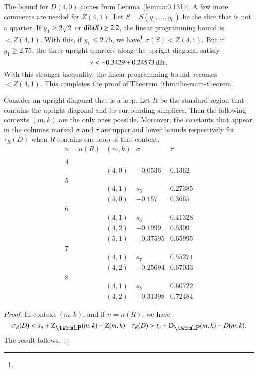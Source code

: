 The bound for $D(4,0)$ comes from Lemma~\ref{lemma:0.1317}. A few
more comments are needed for $Z(4,1)$.  Let $S=S(y_1,\ldots,y_6)$
be the slice that is not a quarter.  If $y_4\ge2\sqrt2$
or $\operatorname{dih}(S)\ge 2.2$, the linear programming bound is $<Z(4,1)$.
With this, if $y_1\le 2.75$, we have\footnote{} %
    $\sigma(S) < Z(4,1)$.
But if $y_1\ge2.75$, the three upright quarters along the upright
diagonal satisfy
    $$\nu< -0.3429+0.24573\operatorname{dih}.$$
With this stronger inequality, the linear programming bound becomes
$<Z(4,1)$. This completes the proof of
Theorem~\ref{thm:the-main-theorem}.

\begin{lemma}\label{lemma:loop}
Consider an upright diagonal that is a loop.  Let $R$ be the
standard region that contains the upright diagonal and its
surrounding simplices.   Then the following contexts $(m,k)$ are the
only ones possible.  Moreover, the constants that appear in the
columns marked $\sigma$ and $\tau$ are upper and lower bounds
respectively for $\tau_R(D)$ when $R$ contains one loop of that
context.
    $$
    \begin{array}{llll}
        n=n(R)&(m,k) &\sigma &\tau \\
        &&&\\
        4& & &\\
        &(4,0) &-0.0536 & 0.1362 \\
        5 & & &\\
        &(4,1) &s_5 &0.27385\\
        &(5,0) &-0.157   &0.3665\\
        6 & & &\\
        &(4,1) &s_6 &0.41328\\
        &(4,2) &-0.1999  &0.5309\\
        &(5,1) &-0.37595 &0.65995\\
        7 & & &\\
        &(4,1) &s_7 &0.55271\\
        &(4,2) &-0.25694 &0.67033\\
        8 & & &\\
        &(4,1) &s_8 &0.60722\\
        &(4,2) &-0.31398 &0.72484
    \end{array}
    $$
\end{lemma}

\begin{proof} In context $(m,k)$, and if $n=n(R)$, we have
    $$
    \sigma_R(D) < s_{n} + \ZLP(m,k)-Z(m,k)\quad
    \tau_R(D)> t_{n}+\DLP(m,k)-D(m,k).
    $$
The result follows.
\end{proof}

